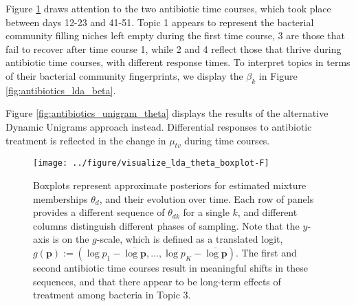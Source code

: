 \documentclass[final]{beamer}
\newlength{\onecolwid}
\begin{document}
\begin{frame}
\begin{columns}
\begin{column}{\onecolwid}

\begin{block}{}
Figure \ref{fig:antibiotics_lda_theta} draws attention to the two antibiotic
time courses, which took place between days 12-23 and 41-51. Topic 1 appears to
represent the bacterial community filling niches left empty during the first
time course, 3 are those that fail to recover after time course 1, while 2 and 4
reflect those that thrive during antibiotic time courses, with different
response times. To interpret topics in terms of their bacterial community
fingerprints, we display the $\beta_{k}$ in Figure
\ref{fig:antibiotics_lda_beta}.

Figure \ref{fig:antibiotics_unigram_theta} displays the results of the
alternative Dynamic Unigrams approach instead. Differential responses to
antibiotic treatment is reflected in the change in $\mu_{tv}$ during time
courses.

\end{block}

\begin{figure}[!p]
  \centering\texttt{[image: ../figure/visualize\_lda\_theta\_boxplot-F]}
  \caption{Boxplots represent approximate posteriors for estimated mixture
    memberships $\theta_{d}$, and their evolution over time. Each row of panels
    provides a different sequence of $\theta_{dk}$ for a single $k$, and
    different columns distinguish different phases of sampling. Note that the
    $y$-axis is on the $g$-scale, which is defined as a translated logit,
    $g\left(\mathbf{p}\right) := \left(\log p_{1} - \overline{\log \mathbf{p}},
    \dots,\log p_{K} - \overline{\log \mathbf{p}}\right)$. The first and second
    antibiotic time courses result in meaningful shifts in these sequences, and
    that there appear to be long-term effects of treatment among bacteria in
    Topic 3. \label{fig:antibiotics_lda_theta}}
\end{figure}



\end{column}
\end{columns}
\end{frame}
\end{document}
